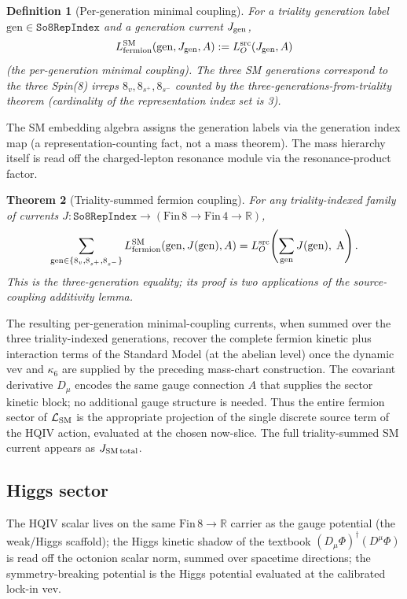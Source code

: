 \documentclass[11pt]{amsart}
\newtheorem{theorem}{Theorem}[section]
\newtheorem{definition}[theorem]{Definition}
\begin{document}
\begin{definition}[Per-generation minimal coupling]
For a triality generation label $\mathrm{gen}\in\texttt{So8RepIndex}$ and a generation current $J_{\rm gen}$,
\[
L_{\rm fermion}^{\rm SM}(\mathrm{gen}, J_{\rm gen}, A) := L_O^{\rm src}(J_{\rm gen},A)
\]
(the per-generation minimal coupling). The three SM generations correspond to the three Spin(8) irreps $8_v, 8_{s^+}, 8_{s^-}$ counted by the three-generations-from-triality theorem (cardinality of the representation index set is 3).
\end{definition}

The SM embedding algebra assigns the generation labels via the generation index map (a representation-counting fact, not a mass theorem). The mass hierarchy itself is read off the charged-lepton resonance module via the resonance-product factor.

\begin{theorem}[Triality-summed fermion coupling]
For any triality-indexed family of currents $J:\texttt{So8RepIndex}\to(\mathrm{Fin}\,8\to\mathrm{Fin}\,4\to\mathbb{R})$,
\[
\sum_{\mathrm{gen}\in\{8_v,8_{s^+},8_{s^-}\}} L_{\rm fermion}^{\rm SM}(\mathrm{gen},J(\mathrm{gen}),A)
= L_O^{\rm src}\!\left(\sum_{\rm gen} J(\rm gen),\;A\right).
\]
This is the three-generation equality; its proof is two applications of the source-coupling additivity lemma.
\end{theorem}

The resulting per-generation minimal-coupling currents, when summed over the three triality-indexed generations, recover the complete fermion kinetic plus interaction terms of the Standard Model (at the abelian level) once the dynamic vev and $\kappa_6$ are supplied by the preceding mass-chart construction. The covariant derivative $D_\mu$ encodes the same gauge connection $A$ that supplies the sector kinetic block; no additional gauge structure is needed. Thus the entire fermion sector of $\mathcal{L}_{\rm SM}$ is the appropriate projection of the single discrete source term of the HQIV action, evaluated at the chosen now-slice. The full triality-summed SM current appears as $J_{\rm SM\,total}$.

\subsection{Higgs sector}

The HQIV scalar lives on the same $\mathrm{Fin}\,8\to\mathbb{R}$ carrier as the gauge potential (the weak/Higgs scaffold); the Higgs kinetic shadow of the textbook $(D_\mu\Phi)^\dagger(D^\mu\Phi)$ is read off the octonion scalar norm, summed over spacetime directions; the symmetry-breaking potential is the Higgs potential \cite{higgs1964,englert1964,nambu1960,goldstone1961} evaluated at the calibrated lock-in vev.
\end{document}
